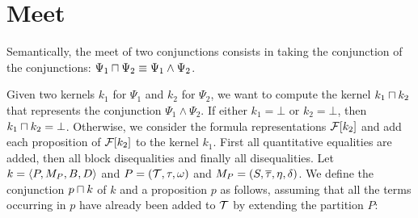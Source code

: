 \section{Meet}\label{section:meet}

Semantically, the meet of two conjunctions consists in taking the conjunction of the conjunctions:
$\Psi_1 \sqcap \Psi_2 \equiv \Psi_1 \land \Psi_2$.

Given two kernels $k_1$ for $\Psi_1$ and $k_2$ for $\Psi_2$,
we want to compute the kernel $k_1 \sqcap k_2$ that represents the conjunction $\Psi_1 \land \Psi_2$.
If either $k_1 = \bot$ or $k_2 = \bot$, then $k_1 \sqcap k_2 = \bot$.
Otherwise, we consider the formula representations $\mathcal{F}[k_2]$ and add each proposition of $\mathcal{F}[k_2]$ to the kernel $k_1$.
First all quantitative equalities are added, then all block disequalities and finally all disequalities.
Let $k = \langle P,M_P,B,D\rangle$ and $P = (\mathcal{T}, \tau, \omega)$ and $M_P = (S, \overline{\tau}, \eta, \delta)$.
We define the conjunction $p \sqcap k$ of $k$ and a proposition $p$ as follows,
assuming that all the terms occurring in $p$ have already been added to $\mathcal{T}$ by extending the partition $P$:
